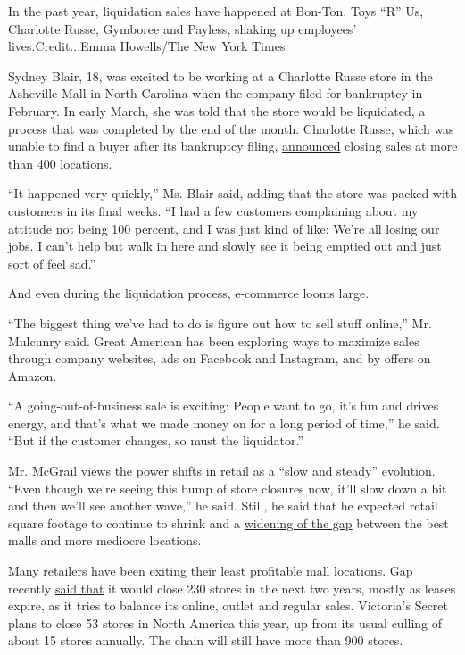 In the past year, liquidation sales have happened at Bon-Ton, Toys ``R''
Us, Charlotte Russe, Gymboree and Payless, shaking up employees'
lives.Credit...Emma Howells/The New York Times

Sydney Blair, 18, was excited to be working at a Charlotte Russe store
in the Asheville Mall in North Carolina when the company filed for
bankruptcy in February. In early March, she was told that the store
would be liquidated, a process that was completed by the end of the
month. Charlotte Russe, which was unable to find a buyer after its
bankruptcy filing,
\href{https://www.sb360.com/sb360-to-conduct-going-out-of-business-sales-at-all-416-charlotte-russe-stores/}{announced}
closing sales at more than 400 locations.

``It happened very quickly,'' Ms. Blair said, adding that the store was
packed with customers in its final weeks. ``I had a few customers
complaining about my attitude not being 100 percent, and I was just kind
of like: We're all losing our jobs. I can't help but walk in here and
slowly see it being emptied out and just sort of feel sad.''

And even during the liquidation process, e-commerce looms large.

``The biggest thing we've had to do is figure out how to sell stuff
online,'' Mr. Mulcunry said. Great American has been exploring ways to
maximize sales through company websites, ads on Facebook and Instagram,
and by offers on Amazon.

``A going-out-of-business sale is exciting: People want to go, it's fun
and drives energy, and that's what we made money on for a long period of
time,'' he said. ``But if the customer changes, so must the
liquidator.''

Mr. McGrail views the power shifts in retail as a ``slow and steady''
evolution. ``Even though we're seeing this bump of store closures now,
it'll slow down a bit and then we'll see another wave,'' he said. Still,
he said that he expected retail square footage to continue to shrink and
a
\href{https://www.nytimes3xbfgragh.onion/2015/01/04/business/the-economics-and-nostalgia-of-dead-malls.html}{widening
of the gap} between the best malls and more mediocre locations.

Many retailers have been exiting their least profitable mall locations.
Gap recently
\href{https://www.nytimes3xbfgragh.onion/2019/02/28/business/gap-old-navy-spinoff.html}{said
that} it would close 230 stores in the next two years, mostly as leases
expire, as it tries to balance its online, outlet and regular sales.
Victoria's Secret plans to close 53 stores in North America this year,
up from its usual culling of about 15 stores annually. The chain will
still have more than 900 stores.

